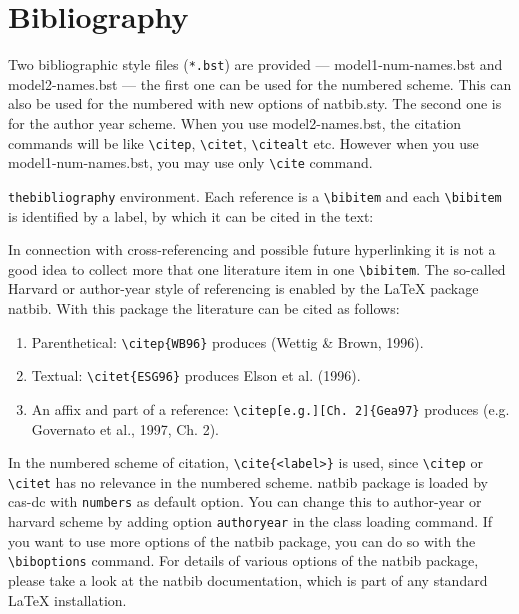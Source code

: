 \documentclass[a4paper,fleqn]{cas-dc}
\begin{document}
				\section{Bibliography}
				
				Two bibliographic style files (\verb+*.bst+) are provided ---
				{model1-num-names.bst} and {model2-names.bst} --- the first one can be
				used for the numbered scheme. This can also be used for the numbered
				with new options of {natbib.sty}. The second one is for the author year
				scheme. When  you use model2-names.bst, the citation commands will be
				like \verb+\citep+,  \verb+\citet+, \verb+\citealt+ etc. However when
				you use model1-num-names.bst, you may use only \verb+\cite+ command.
				
				\verb+thebibliography+ environment.  Each reference is a\linebreak
				\verb+\bibitem+ and each \verb+\bibitem+ is identified by a label,
				by which it can be cited in the text:
				
				\noindent In connection with cross-referencing and
				possible future hyperlinking it is not a good idea to collect
				more that one literature item in one \verb+\bibitem+.  The
				so-called Harvard or author-year style of referencing is enabled
				by the \LaTeX{} package {natbib}. With this package the
				literature can be cited as follows:
				
				\begin{enumerate}[\textbullet]
					\item Parenthetical: \verb+\citep{WB96}+ produces (Wettig \& Brown, 1996).
					\item Textual: \verb+\citet{ESG96}+ produces Elson et al. (1996).
					\item An affix and part of a reference:\break
					\verb+\citep[e.g.][Ch. 2]{Gea97}+ produces (e.g. Governato et
					al., 1997, Ch. 2).
				\end{enumerate}
				
				In the numbered scheme of citation, \verb+\cite{<label>}+ is used,
				since \verb+\citep+ or \verb+\citet+ has no relevance in the numbered
				scheme.  {natbib} package is loaded by {cas-dc} with
				\verb+numbers+ as default option.  You can change this to author-year
				or harvard scheme by adding option \verb+authoryear+ in the class
				loading command.  If you want to use more options of the {natbib}
				package, you can do so with the \verb+\biboptions+ command.  For
				details of various options of the {natbib} package, please take a
				look at the {natbib} documentation, which is part of any standard
				\LaTeX{} installation.
				
\end{document}
